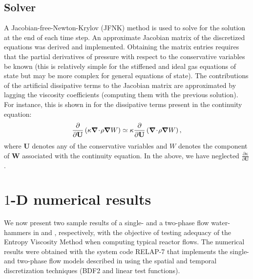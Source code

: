 \documentclass{mc2015}
\begin{document}
\subsection{Solver} \label{sec:solver}
%
A Jacobian-free-Newton-Krylov (JFNK) method is used to solve for the solution at the end of each time step. 
An approximate Jacobian matrix of the discretized equations was derived and implemented. Obtaining the 
matrix entries requires that the partial derivatives of pressure with respect to the conservative variables 
be known (this is relatively simple for the stiffened and ideal gas equations of state but may be more 
complex for general equations of state). The contributions of the artificial dissipative terms to the 
Jacobian matrix are approximated by lagging the viscosity coefficients (computing them with the previous solution). 
For instance, this is shown in  for the dissipative terms present in the continuity equation:
\begin{equation}
\label{eq:jac_diss_term}
\frac{\partial}{\partial \mathbf U} \left( \kappa \boldsymbol\nabla\! \cdot \! \rho \boldsymbol\nabla W \right) \simeq \kappa \frac{\partial}{\partial \mathbf U} \left( \boldsymbol\nabla\! \cdot \! \rho \boldsymbol\nabla W \right),
\end{equation}  
where $\mathbf  U$ denotes any of the conservative variables and $W$ denotes the component of $\mathbf  W$ associated with the 
continuity equation. In the above, we have neglected $\frac{\partial \kappa}{\partial \mathbf U}$.
%
\section{$1$-D numerical results}\label{sec:results}
%
We now present two sample results of a single- and a two-phase flow water-hammers in  and , respectively, with the objective of testing adequacy of the Entropy Viscosity Method when computing typical reactor flows. The numerical results were obtained with the system code RELAP-7 that implements the single- and two-phase flow models described in  using the spatial and temporal discretization techniques  (BDF2 and linear test functions).
\end{document}

